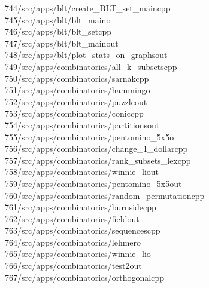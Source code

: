 \begin{tabbing}
744\>/src/apps/blt/create\_BLT\_set\_maincpp\\[0pt]
745\>/src/apps/blt/blt\_maino\\[0pt]
746\>/src/apps/blt/blt\_setcpp\\[0pt]
747\>/src/apps/blt/blt\_mainout\\[0pt]
748\>/src/apps/blt/plot\_stats\_on\_graphsout\\[0pt]
749\>/src/apps/combinatorics/all\_k\_subsetscpp\\[0pt]
750\>/src/apps/combinatorics/sarnakcpp\\[0pt]
751\>/src/apps/combinatorics/hammingo\\[0pt]
752\>/src/apps/combinatorics/puzzleout\\[0pt]
753\>/src/apps/combinatorics/coniccpp\\[0pt]
754\>/src/apps/combinatorics/partitionsout\\[0pt]
755\>/src/apps/combinatorics/pentomino\_5x5o\\[0pt]
756\>/src/apps/combinatorics/change\_1\_dollarcpp\\[0pt]
757\>/src/apps/combinatorics/rank\_subsets\_lexcpp\\[0pt]
758\>/src/apps/combinatorics/winnie\_liout\\[0pt]
759\>/src/apps/combinatorics/pentomino\_5x5out\\[0pt]
760\>/src/apps/combinatorics/random\_permutationcpp\\[0pt]
761\>/src/apps/combinatorics/burnsidecpp\\[0pt]
762\>/src/apps/combinatorics/fieldout\\[0pt]
763\>/src/apps/combinatorics/sequencescpp\\[0pt]
764\>/src/apps/combinatorics/lehmero\\[0pt]
765\>/src/apps/combinatorics/winnie\_lio\\[0pt]
766\>/src/apps/combinatorics/test2out\\[0pt]
767\>/src/apps/combinatorics/orthogonalcpp\\[0pt]

\end{tabbing}
